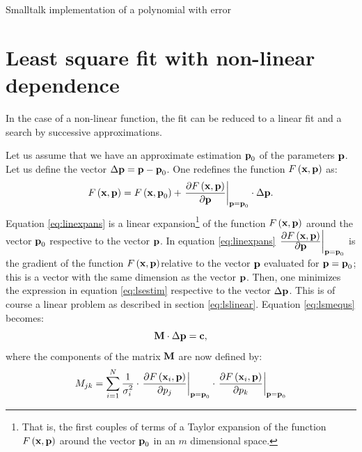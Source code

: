 \begin{listing} Smalltalk implementation of a polynomial with error \label{ls:estpolynom}

\end{listing}


\section{Least square fit with non-linear dependence}
\label{sec:lsfnonlin} In the case of a non-linear function, the
fit can be reduced to a linear fit and a search by successive
approximations.

Let us assume that we have an approximate estimation ${\textbf p}_0$
of the parameters ${\textbf p}$. Let us define the vector $\Delta{\textbf
p}={\textbf p}-{\textbf p}_0$. One redefines the function $F\left({\textbf
x},{\textbf p}\right)$ as:
\begin{equation}
\label{eq:linexpans}
  F\left({\textbf x},{\textbf p}\right)=F\left({\textbf x},{\textbf p}_0\right)
  +\left.{\displaystyle\partial F\left({\textbf x},{\textbf
  p}\right)\over\displaystyle\partial{\textbf p}}\right|_{{\textbf p}={\textbf
  p}_0}\cdot \Delta{\textbf p}.
\end{equation}
Equation \ref{eq:linexpans} is a linear expansion\footnote{That
is, the first couples of terms of a Taylor expansion of the
function $F\left({\textbf x},{\textbf p}\right)$ around the vector ${\textbf
p}_0$ in an $m$ dimensional space.} of the function $F\left({\textbf
x},{\textbf p}\right)$ around the vector ${\textbf p}_0$ respective to the
vector ${\textbf p}$.
In equation \ref{eq:linexpans}
$\left.{\displaystyle\partial F\left({\textbf x},{\textbf
p}\right)\over\displaystyle\partial{\textbf p}}\right|_{{\textbf p}={\textbf
p}_0}$ is the gradient of the function $F\left({\textbf x},{\textbf
p}\right)$relative to the vector ${\textbf p}$ evaluated for ${\textbf
p}={\textbf p}_0$; this is a vector with the same dimension as the
vector ${\textbf p}$.
Then, one minimizes the expression in equation
\ref{eq:lsestim} respective to the vector $\Delta{\textbf p}$. This is
of course a linear problem as described in section
\ref{eq:lslinear}. Equation \ref{eq:lsmequs} becomes:
\begin{equation}
\label{eq:lslinequs}
  {\textbf M}\cdot\Delta{\textbf p}={\textbf c},
\end{equation}
where the components of the matrix ${\textbf M}$ are now defined by:
\begin{equation}
\label{eq:lsmatrix}
  M_{jk}=\sum_{i=1}^N {\displaystyle
  1\over\displaystyle\sigma_i^2}\cdot\left.{\displaystyle\partial F\left({\textbf x}_i,{\textbf
p}\right)\over\displaystyle\partial p_j}\right|_{{\textbf p}={\textbf
p}_0}\cdot\left.{\displaystyle\partial F\left({\textbf x}_i,{\textbf
p}\right)\over\displaystyle\partial p_k}\right|_{{\textbf p}={\textbf
p}_0}
\end{equation}

